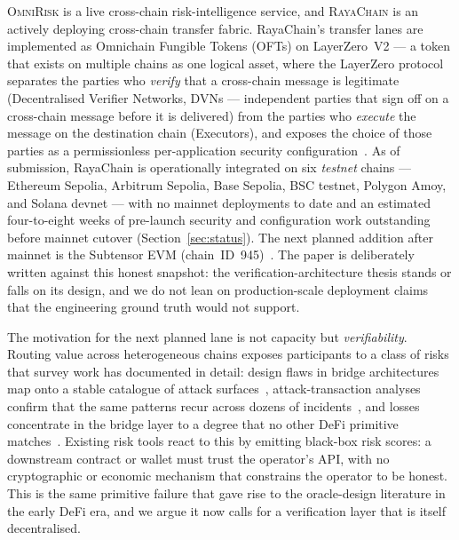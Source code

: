 \documentclass[11pt,a4paper]{article}
\begin{document}
\textsc{OmniRisk} is a live cross-chain risk-intelligence service, and \textsc{RayaChain}
is an actively deploying cross-chain transfer fabric. RayaChain's transfer lanes are
implemented as Omnichain Fungible Tokens (OFTs) on LayerZero~V2 --- a token that exists
on multiple chains as one logical asset, where the LayerZero protocol separates the
parties who \emph{verify} that a cross-chain message is legitimate (Decentralised
Verifier Networks, DVNs --- independent parties that sign off on a cross-chain
message before it is delivered) from the parties who \emph{execute} the message on
the destination chain (Executors), and exposes the choice of those parties as a
permissionless per-application security
configuration~\cite{zarick2024layerzero,layerzero2024oft}. As of submission,
RayaChain is operationally integrated on six \emph{testnet} chains --- Ethereum
Sepolia, Arbitrum Sepolia, Base Sepolia, BSC testnet, Polygon Amoy, and Solana
devnet --- with no mainnet deployments to date and an estimated four-to-eight
weeks of pre-launch security and configuration work outstanding before mainnet
cutover (Section~\ref{sec:status}). The next planned addition after mainnet is
the Subtensor EVM (chain~ID~945)~\cite{opentensor2024evm}. The paper is
deliberately written against this honest snapshot: the verification-architecture
thesis stands or falls on its design, and we do not lean on production-scale
deployment claims that the engineering ground truth would not support.

The motivation for the next planned lane is not capacity but \emph{verifiability}. Routing
value across heterogeneous chains exposes participants to a class of risks that survey
work has documented in detail: design flaws in bridge architectures map onto a stable
catalogue of attack surfaces~\cite{zhang2023sok}, attack-transaction analyses confirm
that the same patterns recur across dozens of incidents~\cite{wu2025safeguarding}, and
losses concentrate in the bridge layer to a degree that no other DeFi primitive
matches~\cite{chainalysis2022bridges,augusto2024sok}. Existing risk tools react to this
by emitting black-box risk scores: a downstream contract or wallet must trust the
operator's API, with no cryptographic or economic mechanism that constrains the
operator to be honest. This is the same primitive failure that gave rise to the
oracle-design literature in the early DeFi era, and we argue it now calls for a
verification layer that is itself decentralised.
\end{document}
